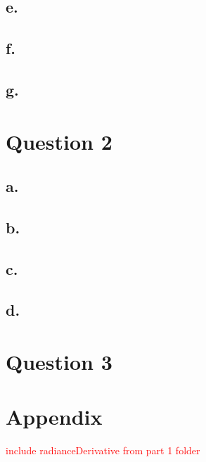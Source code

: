 \documentclass{article}
\newcommand{\xxx}[1]{\textcolor{red}{#1}}
\theoremstyle{plain}
\theoremstyle{definition}
\theoremstyle{remark}
\begin{document}
\subsection*{e.}

\subsection*{f.}

\subsection*{g.}

\section*{Question 2}

\subsection*{a.}

\subsection*{b.}

\subsection*{c.}

\subsection*{d.}

\section*{Question 3}

\section*{Appendix}
\xxx{include radianceDerivative from part 1 folder}
\end{document}
